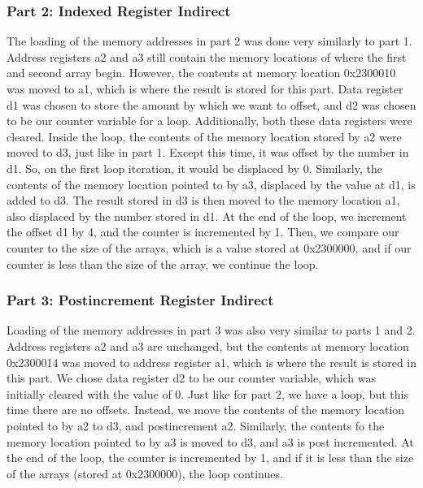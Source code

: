 \documentclass[letterpaper]{article}
\begin{document}
    \subsubsection{Part 2: Indexed Register Indirect}
    The loading of the memory addresses in part 2 was done very similarly to part 1.
    Address registers a2 and a3 still contain the memory locations of where the
    first and second array begin. However, the contents at memory location
    0x2300010 was moved to a1, which is where the result is stored for this
    part. Data register d1 was chosen to store the amount by which we want to
    offset, and d2 was chosen to be our counter variable for a loop.
    Additionally, both these data registers were cleared. Inside the loop, the
    contents of the memory location stored by a2 were moved to d3, just like in
    part 1. Except this time, it was offset by the number in d1. So, on the
    first loop iteration, it would be displaced by 0. Similarly, the contents of
    the memory location pointed to by a3, displaced by the value at d1, is added
    to d3. The result stored in d3 is then moved to the memory location a1, also
    displaced by the number stored in d1. At the end of the loop, we increment
    the offset d1 by 4, and the counter is incremented by 1. Then, we compare our
    counter to the size of the arrays, which is a value stored at 0x2300000, and
    if our counter is less than the size of the array, we continue the loop.


    \subsubsection{Part 3: Postincrement Register Indirect}
    Loading of the memory addresses in part 3 was also very similar to parts 1 and
    2. Address registers a2 and a3 are unchanged, but the  contents at memory
    location 0x2300014 was moved to address register a1, which is where the
    result is stored in this part. We chose data register d2 to be our counter
    variable, which was initially cleared with the value of 0. Just like for
    part 2, we have a loop, but this time there are no offsets. Instead, we move
    the contents of the memory location pointed to by a2 to d3, and
    postincrement a2. Similarly, the contents fo the memory location pointed to
    by a3 is moved to d3, and a3 is post incremented. At the end of the loop,
    the counter is incremented by 1, and if it is less than the size of the
    arrays (stored at 0x2300000), the loop continues.
\end{document}
